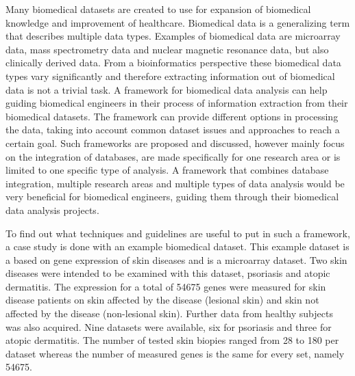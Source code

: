 \documentclass[10pt,a4paper]{article}
\begin{document}
		Many biomedical datasets are created to use for expansion of biomedical knowledge and improvement of healthcare. Biomedical data is a generalizing term that describes multiple data types\cite{gehlenborg2010visualization}. Examples of biomedical data are microarray data\cite{brazma2001minimum}, mass spectrometry data\cite{cottrell1999probability, dettmer2007mass} and nuclear magnetic resonance data\cite{capitani2017nuclear}, but also clinically derived data\cite{liu2012data, sittig2008grand}. From a bioinformatics perspective these biomedical data types vary significantly\cite{gehlenborg2010visualization} and therefore extracting information out of biomedical data is not a trivial task. A framework for biomedical data analysis can help guiding biomedical engineers in their process of information extraction from their biomedical datasets. The framework can provide different options in processing the data, taking into account common dataset issues\cite{bertolazzi2008logic, piatetsky2003microarray,lommen2009metalign} and approaches to reach a certain goal\cite{holzinger2014knowledge, wilkins2009proteomics}. Such frameworks are proposed and discussed, however mainly focus on the integration of databases\cite{teodoro2009biomedical, doi:10.1093/nar/gkm1037}, are made specifically for one research area\cite{sturn2002genesis, karnovsky2011metscape, tabas2012genecodis3} or is limited to one specific type of analysis\cite{faul2007g}. A framework that combines database integration, multiple research areas and multiple types of data analysis would be very beneficial for biomedical engineers, guiding them through their biomedical data analysis projects.

	To find out what techniques and guidelines are useful to put in such a framework, a case study is done with an example biomedical dataset. This example dataset is a based on gene expression of skin diseases\cite{nair2009genome, suarez2012expanding, bigler2013cross, kim2016spectrum, yao2008type, suarez2011nonlesional, tintle2011reversal, gittler2012progressive} and is a microarray dataset. Two skin diseases were intended to be examined with this dataset, psoriasis and atopic dermatitis. The expression for a total of 54675 genes were measured for skin disease patients on skin affected by the disease (lesional skin) and skin not affected by the disease (non-lesional skin). Further data from healthy subjects was also acquired. Nine datasets were available, six for psoriasis\cite{nair2009genome, suarez2012expanding, bigler2013cross, kim2016spectrum, yao2008type} and three for atopic dermatitis\cite{suarez2011nonlesional, tintle2011reversal, gittler2012progressive}. The number of tested skin biopies ranged from 28 to 180 per dataset whereas the number of measured genes is the same for every set, namely 54675.
\end{document}
